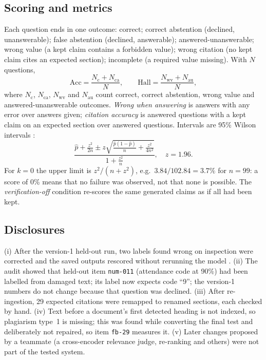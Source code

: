 \documentclass[conference]{IEEEtran}
\newcommand{\code}[1]{\texttt{#1}}
\begin{document}
\subsection{Scoring and metrics}
Each question ends in one outcome: correct; correct abstention (declined, unanswerable); false abstention
(declined, answerable); answered-unanswerable; wrong value (a kept claim contains a forbidden value); wrong
citation (no kept claim cites an expected section); incomplete (a required value missing). With $N$
questions,
\begin{equation}
\mathrm{Acc}=\frac{N_{\mathrm{c}}+N_{\mathrm{ca}}}{N},\qquad
\mathrm{Hall}=\frac{N_{\mathrm{wv}}+N_{\mathrm{au}}}{N},
\end{equation}
where $N_{\mathrm{c}}$, $N_{\mathrm{ca}}$, $N_{\mathrm{wv}}$ and $N_{\mathrm{au}}$ count correct, correct
abstention, wrong value and answered-unanswerable outcomes.
\emph{Wrong when answering} is answers with any error over answers given; \emph{citation accuracy} is
answered questions with a kept claim on an expected section over answered questions. Intervals are 95\%
Wilson intervals \cite{wilson1927}:
\begin{equation}
\frac{\hat p+\frac{z^2}{2n}\pm z\sqrt{\frac{\hat p(1-\hat p)}{n}+\frac{z^2}{4n^2}}}{1+\frac{z^2}{n}},\quad z=1.96.
\end{equation}
For $k=0$ the upper limit is $z^2/(n+z^2)$, e.g.\ $3.84/102.84=3.7\%$ for $n=99$: a score of 0\% means that
no failure was observed, not that none is possible. The \emph{verification-off} condition re-scores the same
generated claims as if all had been kept.

\subsection{Disclosures}\label{sec:disclosure}
(i) After the version-1 held-out run, two labels found wrong on inspection were corrected and the saved
outputs rescored without rerunning the model \cite{prev}. (ii) The audit showed that held-out item
\code{num-011} (attendance code at 90\%) had been labelled from damaged text; its label now expects code
``9''; the version-1 numbers do not change because that question was declined. (iii) After re-ingestion, 29
expected citations were remapped to renamed sections, each checked by hand. (iv) Text before a document's
first detected heading is not indexed, so plagiarism type~1 is missing; this was found while converting the
final test and deliberately not repaired, so item \code{fb-29} measures it. (v) Later changes proposed by
a teammate (a cross-encoder relevance judge, re-ranking and others) were not part of the tested system.
\end{document}
